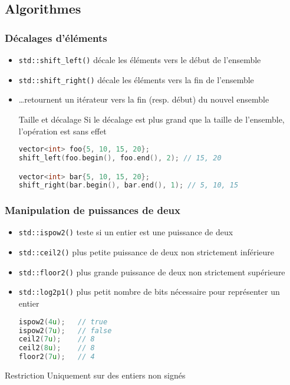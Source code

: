 \documentclass[C++.tex]{subfiles}
\begin{document}
\subsection*{Algorithmes}
\begin{frame}[fragile]
	\frametitle{Décalages d'éléments}
	\begin{itemize}
		\item \lstinline|std::shift_left()| décale les éléments vers le début de l'ensemble
		\item \lstinline|std::shift_right()| décale les éléments vers la fin de l'ensemble
		\item \ldots retournent un itérateur vers la fin (resp. début) du nouvel ensemble

		\begin{block}{Taille et décalage}
			Si le décalage est plus grand que la taille de l'ensemble, l'opération est sans effet
		\end{block}

		\begin{lstlisting}[language=C++]
vector<int> foo{5, 10, 15, 20};
shift_left(foo.begin(), foo.end(), 2); // 15, 20

vector<int> bar{5, 10, 15, 20};
shift_right(bar.begin(), bar.end(), 1); // 5, 10, 15\end{lstlisting}
	\end{itemize}
\end{frame}


\begin{frame}[fragile]
	\frametitle{Manipulation de puissances de deux}
	\begin{itemize}
		\item \lstinline|std::ispow2()| teste si un entier est une puissance de deux
		\item \lstinline|std::ceil2()| plus petite puissance de deux non strictement inférieure
		\item \lstinline|std::floor2()| plus grande puissance de deux non strictement supérieure
		\item \lstinline|std::log2p1()| plus petit nombre de bits nécessaire pour représenter un entier

		\begin{lstlisting}[language=C++]
ispow2(4u);   // true
ispow2(7u);   // false
ceil2(7u);    // 8
ceil2(8u);    // 8
floor2(7u);   // 4\end{lstlisting}
	\end{itemize}

	\begin{alertblock}{Restriction}
		Uniquement sur des entiers non signés
	\end{alertblock}
\end{frame}
\end{document}

